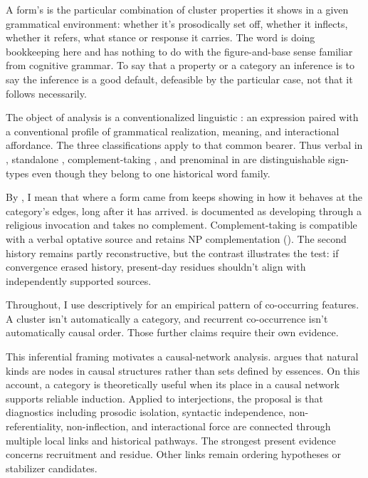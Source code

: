 \documentclass[12pt]{article}
\begin{document}
A form's  is the particular combination of cluster properties it shows
in a given grammatical environment: whether it's prosodically set off,
whether it inflects, whether it refers, what stance or response it carries.
The word is doing bookkeeping here and has nothing to do with the
figure-and-base sense familiar from cognitive grammar. To say that a
property or a category  an inference is to say the inference
is a good default, defeasible by the particular case, not that it follows
necessarily.

The object of analysis is a conventionalized linguistic
: an expression paired with a conventional profile of
grammatical realization, meaning, and interactional affordance. The three
classifications apply to that common bearer. Thus verbal  in
, standalone , complement-taking
, and prenominal  in
 are distinguishable sign-types even though they belong
to one historical word family.

By , I mean that where a form came from keeps
showing in how it behaves at the category's edges, long after it has
arrived.  is documented as developing through a religious
invocation and takes no complement. Complement-taking  is
compatible with a verbal optative source and retains NP complementation
(). The second history remains partly
reconstructive, but the contrast illustrates the test: if convergence erased
history, present-day residues shouldn't align with independently supported
sources.

Throughout, I use  descriptively for an empirical
pattern of co-occurring features. A cluster isn't automatically a category,
and recurrent co-occurrence isn't automatically causal order. Those further
claims require their own evidence.

This inferential framing motivates a causal-network analysis.
\textcite{khalidi2013,khalidi2018nodes} argues that natural kinds are
nodes in causal structures rather than sets defined by essences. On
this account, a category is theoretically useful when its place in a
causal network supports reliable induction. Applied to interjections,
the proposal is that diagnostics including prosodic isolation, syntactic
independence, non-referentiality, non-inflection, and interactional force are
connected through multiple local links and historical pathways. The strongest
present evidence concerns recruitment and residue. Other links remain
ordering hypotheses or stabilizer candidates.
\end{document}
